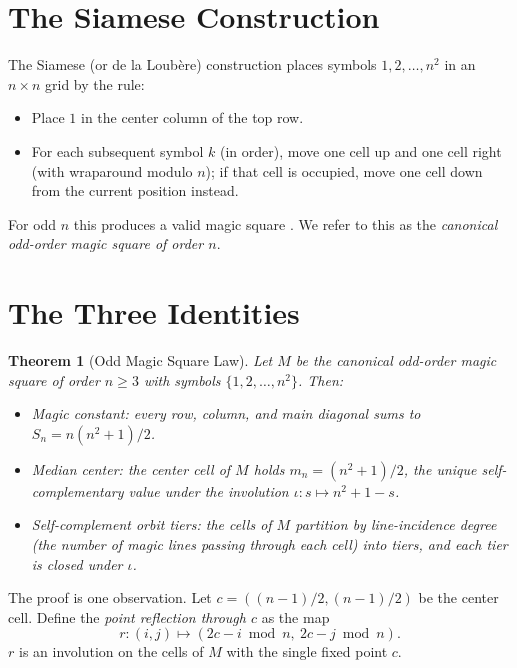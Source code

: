 \documentclass[11pt]{article}
\newtheorem{theorem}{Theorem}
\begin{document}
\section{The Siamese Construction}

The Siamese (or de la Loub\`ere) construction places symbols
$1, 2, \ldots, n^2$ in an $n \times n$ grid by the rule:
\begin{itemize}
\item Place $1$ in the center column of the top row.
\item For each subsequent symbol $k$ (in order), move one cell up and
      one cell right (with wraparound modulo $n$); if that cell is
      occupied, move one cell down from the current position instead.
\end{itemize}
For odd $n$ this produces a valid magic square \cite{ball}. We refer to
this as the \emph{canonical odd-order magic square of order $n$}.

\section{The Three Identities}

\begin{theorem}[Odd Magic Square Law]
\label{thm:main}
Let $M$ be the canonical odd-order magic square of order $n \geq 3$ with
symbols $\{1, 2, \ldots, n^2\}$. Then:
\begin{itemize}
\item[(I)]   \emph{Magic constant:} every row, column, and main diagonal
             sums to $S_n = n(n^2+1)/2$.
\item[(II)]  \emph{Median center:} the center cell of $M$ holds
             $m_n = (n^2+1)/2$, the unique self-complementary value under
             the involution $\iota: s \mapsto n^2 + 1 - s$.
\item[(III)] \emph{Self-complement orbit tiers:} the cells of $M$ partition
             by line-incidence degree (the number of magic lines passing
             through each cell) into tiers, and each tier is closed under
             $\iota$.
\end{itemize}
\end{theorem}

The proof is one observation. Let $c = ((n-1)/2, (n-1)/2)$ be the
center cell. Define the \emph{point reflection through $c$} as the map
\[
r: (i, j) \mapsto (2c - i \bmod n, \ 2c - j \bmod n).
\]
$r$ is an involution on the cells of $M$ with the single fixed point $c$.
\end{document}
